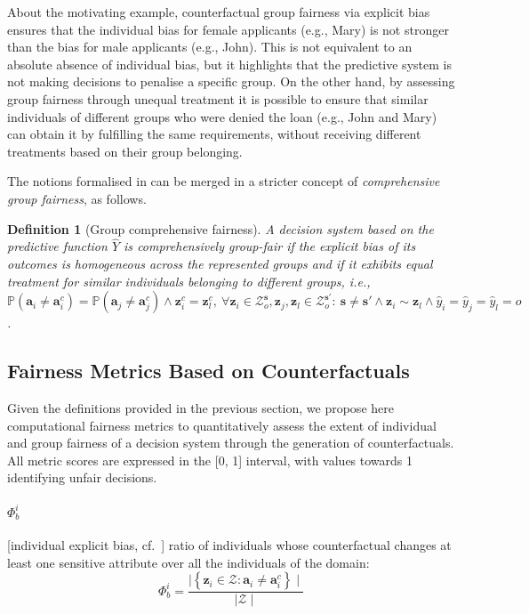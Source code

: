 \documentclass[letterpaper]{article} %
\newtheorem{definition}{Definition}
\begin{document}
About the motivating example, counterfactual group fairness via explicit bias ensures that the individual bias for female applicants (e.g., Mary) is not stronger than the bias for male applicants (e.g., John). This is not equivalent to an absolute absence of individual bias, but it highlights that the predictive system is not making decisions to penalise a specific group.
%
On the other hand, by assessing group fairness through unequal treatment it is possible to ensure that similar individuals of different groups who were denied the loan (e.g., John and Mary) can obtain it by fulfilling the same requirements, without receiving different treatments based on their group belonging.

The notions formalised in  can be merged in a stricter concept of \emph{comprehensive group fairness}, as follows.
%
\begin{definition}[Group comprehensive fairness]\label{comprehensive_group}
	A decision system based on the predictive function $\hat{Y}$ is \emph{comprehensively group-fair} if the explicit bias of its outcomes is homogeneous across the represented groups and if it exhibits equal treatment for similar individuals belonging to different groups, i.e., $\mathbb{P}(\boldsymbol{a}_{i} \neq \boldsymbol{a}_{i}^{c}) = \mathbb{P}(\boldsymbol{a}_{j} \neq \boldsymbol{a}_{j}^{c}) \wedge \boldsymbol{z}_i^c = \boldsymbol{z}_l^c, ~ \forall \boldsymbol{z}_i \in \mathcal{Z}^{\boldsymbol{s}}_o, \boldsymbol{z}_j, \boldsymbol{z}_l \in \mathcal{Z}^{\boldsymbol{s}'}_o : ~ \boldsymbol{s} \neq \boldsymbol{s}' \wedge \boldsymbol{z}_i \sim \boldsymbol{z}_l \wedge \hat{y}_i = \hat{y}_j = \hat{y}_l = o$.
\end{definition}

\subsection{Fairness Metrics Based on Counterfactuals}

Given the definitions provided in the previous section, we propose here computational fairness metrics to quantitatively assess the extent of individual and group fairness of a decision system through the generation of counterfactuals.
%
All metric scores are expressed in the [0, 1] interval, with values towards 1 identifying unfair decisions.

\paragraph{$\Phi_b^i$} [individual explicit bias, cf.\ ] ratio of individuals whose counterfactual changes at least one sensitive attribute over all the individuals of the domain:
%
$$\Phi_b^i = \frac{ \mid \left\{ \boldsymbol{z}_i \in \mathcal{Z} : \boldsymbol{a}_{i} \neq \boldsymbol{a}_{i}^{c} \right\} \mid }{\mid \mathcal{Z} \mid} $$
\end{document}
